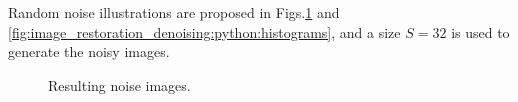 Random noise illustrations are proposed in Figs.\ref{fig:image_restoration_denoising:python:noises} and \ref{fig:image_restoration_denoising:python:histograms}, and a size $S=32$ is used to generate the noisy images.
\begin{figure}[ht]
 \centering\caption{Resulting noise images.}%
 \hfill
 
   \hfill
\vspace*{-8pt}%
 \label{fig:image_restoration_denoising:python:noises}%
\end{figure}

